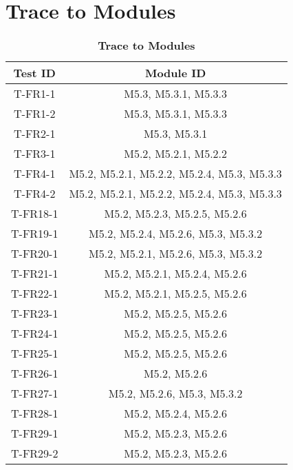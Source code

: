 \documentclass[12pt, titlepage]{article}
\begin{document}
\section{Trace to Modules}	
    \begin{center}
    \begin{longtable}{ |c|c| } 
        \caption{\textbf{Trace to Modules}} \label{tab:long}\\
        \hline
        \multicolumn{1}{|c|}{\textbf{Test ID}} & \multicolumn{1}{c|}{\textbf{Module ID}} \\ 
        \hline 
        \endfirsthead
        
        \hline
        T-FR1-1     & M5.3, M5.3.1, M5.3.3 \\ 
        T-FR1-2     & M5.3, M5.3.1, M5.3.3 \\ 
        \hline
        T-FR2-1     & M5.3, M5.3.1 \\ 
        \hline
        T-FR3-1     & M5.2, M5.2.1, M5.2.2 \\ 
        \hline
        T-FR4-1     & M5.2, M5.2.1, M5.2.2, M5.2.4, M5.3, M5.3.3 \\ 
        T-FR4-2     & M5.2, M5.2.1, M5.2.2, M5.2.4, M5.3, M5.3.3 \\ 
        \hline
        T-FR18-1    & M5.2, M5.2.3, M5.2.5, M5.2.6 \\ 
        \hline
        T-FR19-1    & M5.2, M5.2.4, M5.2.6, M5.3, M5.3.2 \\ 
        \hline
        T-FR20-1    & M5.2, M5.2.1, M5.2.6, M5.3, M5.3.2 \\ 
        \hline
        T-FR21-1    & M5.2, M5.2.1, M5.2.4, M5.2.6 \\ 
        \hline
        T-FR22-1    & M5.2, M5.2.1, M5.2.5, M5.2.6 \\ 
        \hline
        T-FR23-1    & M5.2, M5.2.5, M5.2.6 \\ 
        \hline
        T-FR24-1    & M5.2, M5.2.5, M5.2.6 \\ 
        \hline
        T-FR25-1    & M5.2, M5.2.5, M5.2.6 \\ 
        \hline
        T-FR26-1    & M5.2, M5.2.6 \\ 
        \hline
        T-FR27-1    & M5.2, M5.2.6, M5.3, M5.3.2 \\ 
        \hline
        T-FR28-1    & M5.2, M5.2.4, M5.2.6 \\
        \hline
        T-FR29-1    & M5.2, M5.2.3, M5.2.6 \\ 
        T-FR29-2    & M5.2, M5.2.3, M5.2.6 \\ 

\end{longtable}
\end{center}
\end{document}
